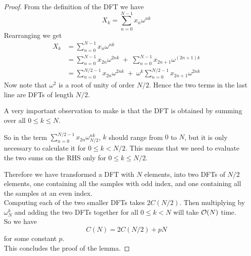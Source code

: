 \begin{proof}
From the definition of the DFT we have
\[
    X_k = \sum^{N-1}_{n=0}x_n\omega^{nk}
\]
Rearranging we get
\begin{align}
    X_k
    &= \sum^{N-1}_{n=0}x_n\omega^{nk} \nonumber\\
    &= \sum^{N-1}_{n=0}x_{2n}\omega^{2nk} \;+\; \sum^{N-1}_{n=0}x_{2n+1} \omega^{(2n+1)k} \nonumber\\
    &= \sum^{N/2-1}_{n=0}x_{2n}\omega^{2nk} \;+\; \omega^k \sum^{N/2-1}_{n=0}x_{2n+1}\omega^{2nk} \label{eq:keystep}
\end{align}
Now note that $\omega^2$ is a root of unity of order $N/2$. Hence the two terms in the last line are DFTs of length $N/2$.

A very important observation to make is that the DFT is obtained by summing over all $0\leq k \leq N$.

So in the term $\sum^{N/2-1}_{n=0}x_{2n}\omega^{nk}_{N/2}$, $k$ should range from $0$ to $N$, but it is only necessary to calculate it for $0 \leq k < N/2$. This means that we need to evaluate the two sums on the RHS only for $0 \leq k \leq N/2$.

Therefore we have transformed a DFT with $N$ elements, into two DFTs of $N/2$ elements, one containing all the samples with odd index, and one containing all the samples at an even index.\\
Computing each of the two smaller DFTs takes $2C(N/2)$. Then multiplying by $\omega^k_N$ and adding the two DFTs together for all $0 \leq k < N$ will take $\mathcal O(N)$ time. \\
So we have
\[
    C(N) = 2 C(N/2) + pN
\]
for some constant $p$.\\
This concludes the proof of the lemma.
\end{proof}





